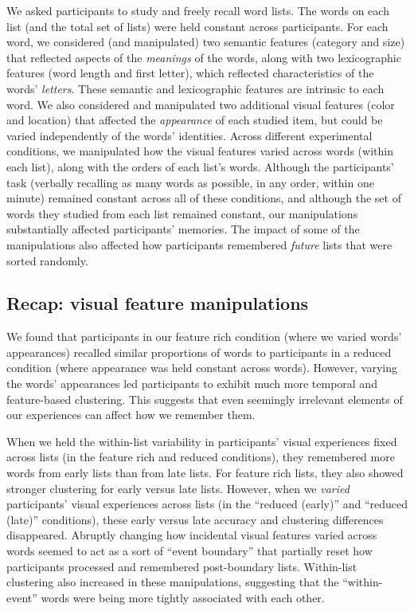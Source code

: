\documentclass[11pt]{article}
\begin{document}
We asked participants to study and freely recall word lists. The words on each
list (and the total set of lists) were held constant across participants. For
each word, we considered (and manipulated) two semantic features (category and
size) that reflected aspects of the \textit{meanings} of the words, along with
two lexicographic features (word length and first letter), which reflected
characteristics of the words' \textit{letters}. These semantic and
lexicographic features are intrinsic to each word. We also considered and
manipulated two additional visual features (color and location) that affected
the \textit{appearance} of each studied item, but could be varied independently
of the words' identities. Across different experimental conditions, we
manipulated how the visual features varied across words (within each list),
along with the orders of each list's words. Although the participants' task
(verbally recalling as many words as possible, in any order, within one minute)
remained constant across all of these conditions, and although the set of words
they studied from each list remained constant, our manipulations substantially
affected participants' memories. The impact of some of the manipulations also
affected how participants remembered \textit{future} lists that were sorted
randomly.


\subsection*{Recap: visual feature manipulations}

We found that participants in our feature rich condition (where we varied
words' appearances) recalled similar proportions of words to participants in a
reduced condition (where appearance was held constant across words). However,
varying the words' appearances led participants to exhibit much more temporal
and feature-based clustering. This suggests that even seemingly irrelevant
elements of our experiences can affect how we remember them.

When we held the within-list variability in participants' visual experiences
fixed across lists (in the feature rich and reduced conditions), they
remembered more words from early lists than from late lists. For feature rich
lists, they also showed stronger clustering for early versus late lists.
However, when we \textit{varied} participants' visual experiences across lists
(in the ``reduced (early)'' and ``reduced (late)'' conditions), these early
versus late accuracy and clustering differences disappeared. Abruptly changing
how incidental visual features varied across words seemed to act as a sort of
``event boundary'' that partially reset how participants processed and
remembered post-boundary lists. Within-list clustering also increased in these
manipulations, suggesting that the ``within-event'' words were being more tightly
associated with each other.
\end{document}
